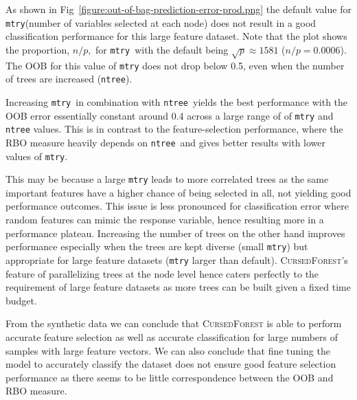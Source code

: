 \documentclass[10pt,letterpaper]{article}
\newcommand{\cursedforest}{\textsc{CursedForest}\xspace}
\newcommand{\mtry}{\texttt{mtry}\xspace}
\newcommand{\ntree}{\texttt{ntree}\xspace}
\begin{document}
As shown in Fig~\ref{figure:out-of-bag-prediction-error-prod.png} the default value for \mtry (number of variables
selected at each node) does not result in a good classification performance for this large feature dataset. Note that
the plot shows the proportion, $n/p,$ for \mtry\ with the default being $\sqrt{p} \approx 1581$ ($n/p=0.0006$).  The
OOB for this value of \mtry does not drop below 0.5, even when the number of trees are increased (\ntree).

Increasing \mtry\ in combination with \ntree\ yields the best performance with the OOB error essentially constant around 0.4
across a large range of of \mtry and \ntree values.  This is in contrast to the feature-selection performance, where the
RBO measure heavily depends on \ntree\ and gives better results with lower values of \mtry.

This may be because a large \mtry leads to more correlated trees as the same important features have a higher chance of
being selected in all, not yielding good performance outcomes.  This issue is less pronounced for classification error
where random features can mimic the response variable, hence resulting more in a performance plateau.  Increasing the
number of trees on the other hand improves performance especially when the trees are kept diverse (small \mtry) but
appropriate for large feature datasets (\mtry larger than default). \cursedforest's feature of parallelizing trees at
the node level hence caters perfectly to the requirement of large feature datasets as more trees can be built given a
fixed time budget.


From the synthetic data we can conclude that \cursedforest is able to perform accurate feature selection as well as
accurate classification for large numbers of samples with large feature vectors.  We can also conclude that fine tuning
the model to accurately classify the dataset does not ensure good feature selection performance as there seems to be
little correspondence between the OOB and RBO measure.
\end{document}
